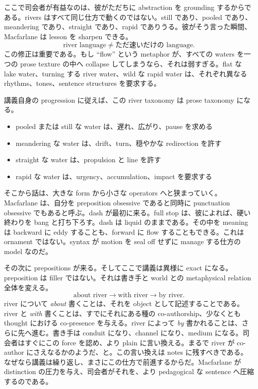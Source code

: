 ここで司会者が有益なのは、彼がただちに abstraction を grounding するからである。rivers はすべて同じ仕方で動くのではない。still であり、pooled であり、meandering であり、straight であり、rapid でありうる。彼がそう言った瞬間、Macfarlane は lesson を sharpen できる。
\begin{equation}
\text{river language} \neq \text{ただ速いだけの language}.
\end{equation}
この修正は重要である。もし ``flow'' という metaphor が、すべての waters を一つの prose texture の中へ collapse してしまうなら、それは弱すぎる。flat な lake water、turning する river water、wild な rapid water は、それぞれ異なる rhythms、tones、sentence structures を要求する。

講義自身の progression に従えば、この river taxonomy は prose taxonomy になる。
\begin{itemize}
\item pooled または still な water は、遅れ、広がり、pause を求める
\item meandering な water は、drift、turn、穏やかな redirection を許す
\item straight な water は、propulsion と line を許す
\item rapid な water は、urgency、accumulation、impact を要求する
\end{itemize}

そこから話は、大きな form から小さな operators へと狭まっていく。Macfarlane は、自分を preposition obsessive であると同時に punctuation obsessive でもあると呼ぶ。dash が最初に来る。full stop は、彼によれば、硬い終わりを bang と打ち下ろす。dash は liquid のままである。その中を meaning は backward に eddy することも、forward に flow することもできる。これは ornament ではない。syntax が motion を seal off せずに manage する仕方の model なのだ。

その次に prepositions が来る。そしてここで講義は異様に exact になる。preposition は filler ではない。それは書き手と world との metaphysical relation 全体を変える。
\begin{equation}
\text{about river} \longrightarrow \text{with river} \longrightarrow \text{by river}.
\end{equation}
river について \emph{about} 書くことは、それを object として記述することである。river と \emph{with} 書くことは、すでにそれにある種の co-authorship、少なくとも thought における co-presence を与える。river によって \emph{by} 書かれることは、さらに先へ進む。書き手は conduit になり、channel になり、medium になる。司会者はすぐにこの force を認め、より plain に言い換える。まるで river が co-author にさえなるかのようだ、と。この言い換えは notes に残すべきである。なぜなら講義は繰り返し、まさにこの仕方で前進するからだ。Macfarlane が distinction の圧力を与え、司会者がそれを、より pedagogical な sentence へ圧縮するのである。

